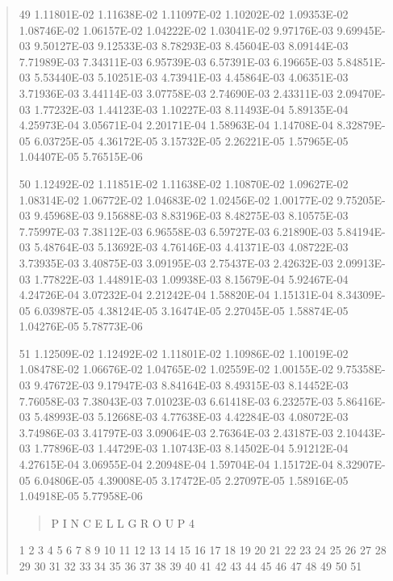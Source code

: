 \documentclass[letterpaper,10pt,english]{sphinxmanual}
\begin{document}
\begin{quote}
\begin{DUlineblock}{0em}
\item[] 49   1.11801E-02  1.11638E-02  1.11097E-02  1.10202E-02  1.09353E-02  1.08746E-02  1.06157E-02  1.04222E-02  1.03041E-02  9.97176E-03  9.69945E-03  9.50127E-03  9.12533E-03  8.78293E-03  8.45604E-03  8.09144E-03  7.71989E-03  7.34311E-03  6.95739E-03  6.57391E-03  6.19665E-03  5.84851E-03  5.53440E-03  5.10251E-03  4.73941E-03  4.45864E-03  4.06351E-03  3.71936E-03  3.44114E-03  3.07758E-03  2.74690E-03  2.43311E-03  2.09470E-03  1.77232E-03  1.44123E-03  1.10227E-03  8.11493E-04  5.89135E-04  4.25973E-04  3.05671E-04  2.20171E-04  1.58963E-04  1.14708E-04  8.32879E-05  6.03725E-05  4.36172E-05  3.15732E-05  2.26221E-05  1.57965E-05  1.04407E-05  5.76515E-06
\item[] 50   1.12492E-02  1.11851E-02  1.11638E-02  1.10870E-02  1.09627E-02  1.08314E-02  1.06772E-02  1.04683E-02  1.02456E-02  1.00177E-02  9.75205E-03  9.45968E-03  9.15688E-03  8.83196E-03  8.48275E-03  8.10575E-03  7.75997E-03  7.38112E-03  6.96558E-03  6.59727E-03  6.21890E-03  5.84194E-03  5.48764E-03  5.13692E-03  4.76146E-03  4.41371E-03  4.08722E-03  3.73935E-03  3.40875E-03  3.09195E-03  2.75437E-03  2.42632E-03  2.09913E-03  1.77822E-03  1.44891E-03  1.09938E-03  8.15679E-04  5.92467E-04  4.24726E-04  3.07232E-04  2.21242E-04  1.58820E-04  1.15131E-04  8.34309E-05  6.03987E-05  4.38124E-05  3.16474E-05  2.27045E-05  1.58874E-05  1.04276E-05  5.78773E-06
\item[] 51   1.12509E-02  1.12492E-02  1.11801E-02  1.10986E-02  1.10019E-02  1.08478E-02  1.06676E-02  1.04765E-02  1.02559E-02  1.00155E-02  9.75358E-03  9.47672E-03  9.17947E-03  8.84164E-03  8.49315E-03  8.14452E-03  7.76058E-03  7.38043E-03  7.01023E-03  6.61418E-03  6.23257E-03  5.86416E-03  5.48993E-03  5.12668E-03  4.77638E-03  4.42284E-03  4.08072E-03  3.74986E-03  3.41797E-03  3.09064E-03  2.76364E-03  2.43187E-03  2.10443E-03  1.77896E-03  1.44729E-03  1.10743E-03  8.14502E-04  5.91212E-04  4.27615E-04  3.06955E-04  2.20948E-04  1.59704E-04  1.15172E-04  8.32907E-05  6.04806E-05  4.39008E-05  3.17472E-05  2.27097E-05  1.58916E-05  1.04918E-05  5.77958E-06
\end{DUlineblock}
\begin{quote}

P I N  C E L L       G R O U P 4
\end{quote}

\begin{DUlineblock}{0em}
\item[] 1        2        3        4        5        6        7        8        9           10           11           12           13           14           15           16           17           18           19           20           21           22           23           24           25           26           27           28           29           30           31           32           33           34           35           36           37           38           39           40           41           42           43           44           45           46           47           48           49           50           51
\end{DUlineblock}


\end{quote}
\end{document}
